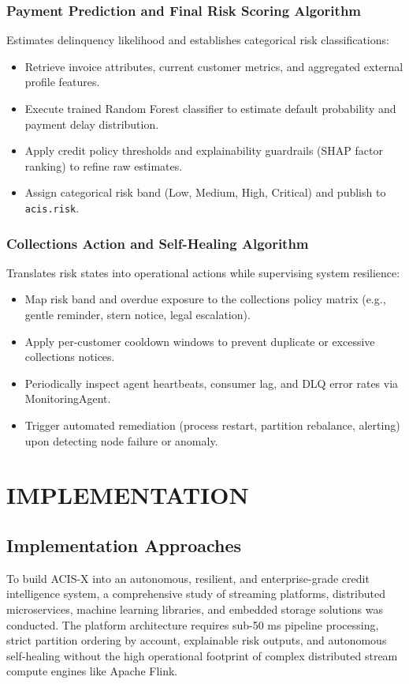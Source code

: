 \documentclass[a4paper, 12pt]{report}
\begin{document}
\subsection{Payment Prediction and Final Risk Scoring Algorithm}
Estimates delinquency likelihood and establishes categorical risk classifications:
\begin{itemize}[itemsep=2pt]
    \item Retrieve invoice attributes, current customer metrics, and aggregated external profile features.
    \item Execute trained Random Forest classifier to estimate default probability and payment delay distribution.
    \item Apply credit policy thresholds and explainability guardrails (SHAP factor ranking) to refine raw estimates.
    \item Assign categorical risk band (Low, Medium, High, Critical) and publish to \texttt{acis.risk}.
\end{itemize}

\subsection{Collections Action and Self-Healing Algorithm}
Translates risk states into operational actions while supervising system resilience:
\begin{itemize}[itemsep=2pt]
    \item Map risk band and overdue exposure to the collections policy matrix (e.g., gentle reminder, stern notice, legal escalation).
    \item Apply per-customer cooldown windows to prevent duplicate or excessive collections notices.
    \item Periodically inspect agent heartbeats, consumer lag, and DLQ error rates via MonitoringAgent.
    \item Trigger automated remediation (process restart, partition rebalance, alerting) upon detecting node failure or anomaly.
\end{itemize}
\chapter{IMPLEMENTATION}
\thispagestyle{chapterfirstpage}

\section{Implementation Approaches}
To build ACIS-X into an autonomous, resilient, and enterprise-grade credit intelligence system, a comprehensive study of streaming platforms, distributed microservices, machine learning libraries, and embedded storage solutions was conducted. The platform architecture requires sub-50 ms pipeline processing, strict partition ordering by account, explainable risk outputs, and autonomous self-healing without the high operational footprint of complex distributed stream compute engines like Apache Flink. 
\end{document}
